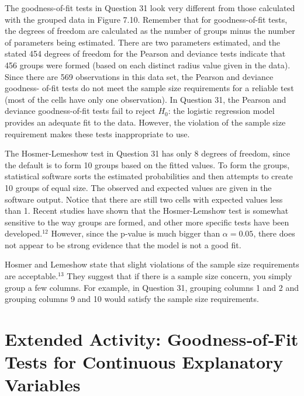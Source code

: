 \documentclass[
]{report}
\begin{document}
The goodness-of-fit tests in Question 31 look very different from those calculated with the grouped data
in Figure 7.10. Remember that for goodness-of-fit tests, the degrees of freedom are calculated as the number of
groups minus the number of parameters being estimated. There are two parameters estimated, and the stated 454
degrees of freedom for the Pearson and deviance tests indicate that 456 groups were formed (based on each distinct
radius value given in the data). Since there are 569 observations in this data set, the Pearson and deviance goodness-
of-fit tests do not meet the sample size requirements for a reliable test (most of the cells have only one observation).
In Question 31, the Pearson and deviance goodness-of-fit tests fail to reject \(H_0\): the logistic regression
model provides an adequate fit to the data. However, the violation of the sample size requirement makes these
tests inappropriate to use.

The Hosmer-Lemeshow test in Question 31 has only 8 degrees of freedom, since the default is to form 10
groups based on the fitted values. To form the groups, statistical software sorts the estimated probabilities and
then attempts to create 10 groups of equal size. The observed and expected values are given in the software
output. Notice that there are still two cells with expected values less than 1. Recent studies have shown that
the Hosmer-Lemshow test is somewhat sensitive to the way groups are formed, and other more specific tests
have been developed.\(^12\) However, since the p-value is much bigger than \(\alpha = 0.05\), there does not appear to
be strong evidence that the model is not a good fit.

Hosmer and Lemeshow state that slight violations of the sample size requirements are acceptable.\(^13\) They
suggest that if there is a sample size concern, you simply group a few columns. For example, in Question
31, grouping columns 1 and 2 and grouping columns 9 and 10 would satisfy the sample size requirements.

\hypertarget{extended-activity-goodnessoffit-tests-for-continuous-explanatory-variables-3}{%
\section*{Extended Activity: Goodness‐of‐Fit Tests for Continuous Explanatory Variables}\label{extended-activity-goodnessoffit-tests-for-continuous-explanatory-variables-3}}
\end{document}
